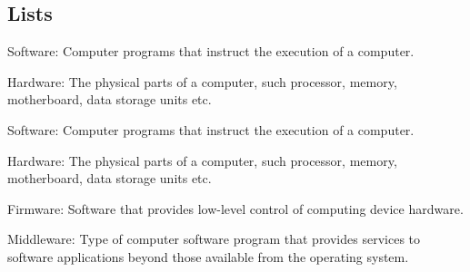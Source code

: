 \documentclass[a4paper, 11pt]{article}
\begin{document}
%

\subsection{Lists}\label{sec:enumitem}

\begin{PLTEnumerate}
    \item Software: Computer programs that instruct the execution of a computer.
    \item Hardware: The physical parts of a computer, such processor, memory, motherboard, data storage units etc.
    \begin{PLTEnumerate}
        \item Software: Computer programs that instruct the execution of a computer.
        \item Hardware: The physical parts of a computer, such processor, memory, motherboard, data storage units etc.
    \end{PLTEnumerate}
    \item Firmware: Software that provides low-level control of computing device hardware.
    \item Middleware: Type of computer software program that provides services to software applications beyond those available from the operating system.
\end{PLTEnumerate}
\end{document}
